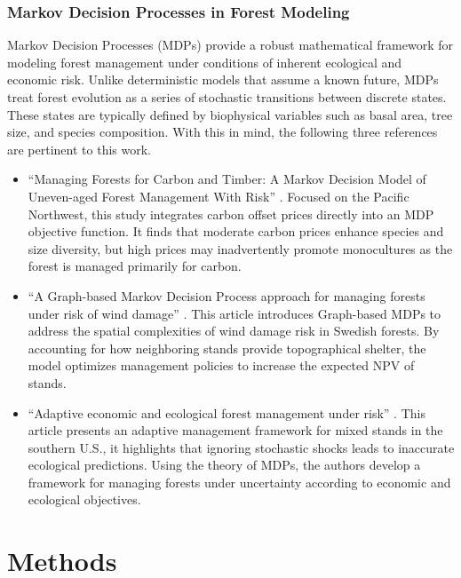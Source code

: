 \documentclass[12pt]{report}
\begin{document}
\subsection{Markov Decision Processes in Forest Modeling}
Markov Decision Processes (MDPs) provide a robust mathematical framework for modeling forest management under conditions of inherent ecological and economic risk. Unlike deterministic models that assume a known future, MDPs treat forest evolution as a series of stochastic transitions between discrete states. These states are typically defined by biophysical variables such as basal area, tree size, and species composition. With this in mind, the following three references are pertinent to this work.
\begin{itemize}
\item ``Managing Forests for Carbon and Timber: A Markov Decision Model of Uneven-aged Forest Management With Risk'' \parencite{johnstonManagingForestsCarbon2017}.
Focused on the Pacific Northwest, this study integrates carbon offset prices directly into an MDP objective function. It finds that moderate carbon prices enhance species and size diversity, but high prices may inadvertently promote monocultures as the forest is managed primarily for carbon.

\item ``A Graph-based Markov Decision Process approach for managing forests under risk of wind damage'' \parencite{forsellGraphbasedMarkovDecision2011}.
This article introduces Graph-based MDPs to address the spatial complexities of wind damage risk in Swedish forests. By accounting for how neighboring stands provide topographical shelter, the model optimizes management policies to increase the expected NPV of stands.

\item ``Adaptive economic and ecological forest management under risk'' \parencite{buongiornoAdaptiveEconomicEcological2015}.
This article presents an adaptive management framework for mixed stands in the southern U.S., it highlights that ignoring stochastic shocks leads to inaccurate ecological predictions. Using the theory of MDPs, the authors develop a framework for managing forests under uncertainty according to economic and ecological objectives.

\end{itemize}

\chapter{Methods}
\end{document}
